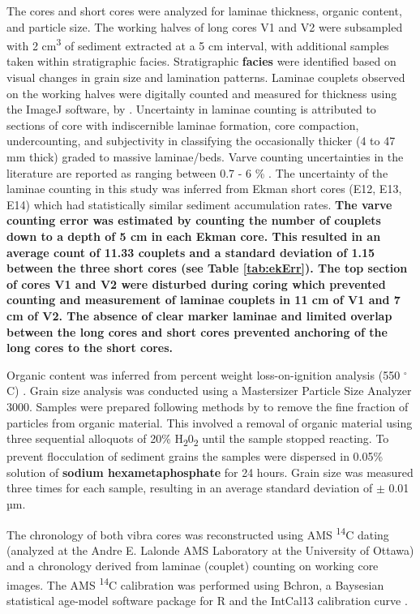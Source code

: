 \documentclass[Royal,times,doublespace,sageh]{sagej}
\begin{document}
The cores and short cores were analyzed for laminae thickness, organic
content, and particle size. The working halves of long cores V1 and V2
were subsampled with 2 cm\textsuperscript{3} of sediment extracted at a
5 cm interval, with additional samples taken within stratigraphic
facies. Stratigraphic \textbf{facies} were identified based on visual
changes in grain size and lamination patterns. Laminae couplets observed
on the working halves were digitally counted and measured for thickness
using the ImageJ software, by \citet{Schneider2012}. Uncertainty in
laminae counting is attributed to sections of core with indiscernible
laminae formation, core compaction, undercounting, and subjectivity in
classifying the occasionally thicker (4 to 47 mm thick) graded to
massive laminae/beds. Varve counting uncertainties in the literature are
reported as ranging between 0.7 - 6 \%
\citep{Menounos2008c, Zolitschka1991}. The uncertainty of the laminae
counting in this study was inferred from Ekman short cores (E12, E13,
E14) which had statistically similar sediment accumulation rates.
\textbf{The varve counting error was estimated by counting the number of
couplets down to a depth of 5 cm in each Ekman core. This resulted in an
average count of 11.33 couplets and a standard deviation of 1.15 between
the three short cores (see Table \ref{tab:ekErr}). The top section of
cores V1 and V2 were disturbed during coring which prevented counting
and measurement of laminae couplets in 11 cm of V1 and 7 cm of V2. The
absence of clear marker laminae and limited overlap between the long
cores and short cores prevented anchoring of the long cores to the short
cores.}

Organic content was inferred from percent weight loss-on-ignition
analysis (550 \(^{\circ}\)C) \citep{Dean1974, Smith2003}. Grain size
analysis was conducted using a Mastersizer Particle Size Analyzer 3000.
Samples were prepared following methods by \citet{Gray2010} to remove
the fine fraction of particles from organic material. This involved a
removal of organic material using three sequential alloquots of 20\%
H\textsubscript{2}0\textsubscript{2} until the sample stopped reacting.
To prevent flocculation of sediment grains the samples were dispersed in
0.05\% solution of \textbf{sodium hexametaphosphate} for 24 hours. Grain
size was measured three times for each sample, resulting in an average
standard deviation of \(\pm\) 0.01 µm.

The chronology of both vibra cores was reconstructed using AMS
\textsuperscript{14}C dating (analyzed at the Andre E. Lalonde AMS
Laboratory at the University of Ottawa) and a chronology derived from
laminae (couplet) counting on working core images. The AMS
\textsuperscript{14}C calibration was performed using Bchron, a
Baysesian statistical age-model software package for R
\citep{Parnell2008, Parnell2011, Haslett2008} and the IntCal13
calibration curve \citep{Reimer2013}.
\end{document}

